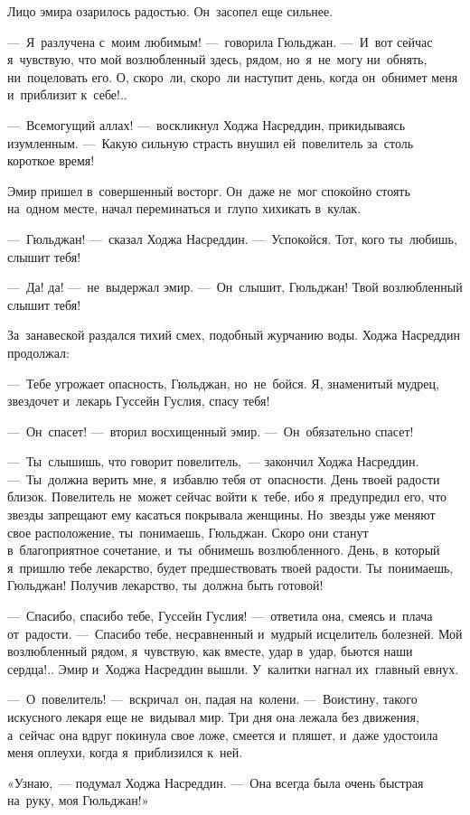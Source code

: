 \documentclass[12pt,a4paper]{book}
\begin{document}
Лицо эмира озарилось радостью. Он~засопел еще сильнее.

—~Я~разлучена с~моим любимым! —~говорила Гюльджан. —~И~вот сейчас я~чувствую, что мой возлюбленный здесь, рядом, но~я~не~могу ни~обнять, ни~поцеловать его. О, скоро~ли, скоро~ли наступит день, когда он~обнимет меня и~приблизит к~себе!..

—~Всемогущий аллах! —~воскликнул Ходжа Насреддин, прикидываясь изумленным. —~Какую сильную страсть внушил ей~повелитель за~столь короткое время!

Эмир пришел в~совершенный восторг. Он~даже не~мог спокойно стоять на~одном месте, начал переминаться и~глупо хихикать в~кулак.

—~Гюльджан! —~сказал Ходжа Насреддин. —~Успокойся. Тот, кого ты~любишь, слышит тебя!

—~Да! да! —~не~выдержал эмир. —~Он~слышит, Гюльджан! Твой возлюбленный слышит тебя!

За~занавеской раздался тихий смех, подобный журчанию воды. Ходжа Насреддин продолжал:

—~Тебе угрожает опасность, Гюльджан, но~не~бойся. Я, знаменитый мудрец, звездочет и~лекарь Гуссейн Гуслия, спасу тебя!

—~Он~спасет! —~вторил восхищенный эмир. —~Он~обязательно спасет!

—~Ты~слышишь, что говорит повелитель,~— закончил Ходжа Насреддин. —~Ты~должна верить мне, я~избавлю тебя от~опасности. День твоей радости близок. Повелитель не~может сейчас войти к~тебе, ибо я~предупредил его, что звезды запрещают ему касаться покрывала женщины. Но~звезды уже меняют свое расположение, ты~понимаешь, Гюльджан. Скоро они станут в~благоприятное сочетание, и~ты~обнимешь возлюбленного. День, в~который я~пришлю тебе лекарство, будет предшествовать твоей радости. Ты~понимаешь, Гюльджан! Получив лекарство, ты~должна быть готовой!

—~Спасибо, спасибо тебе, Гуссейн Гуслия! —~ответила она, смеясь и~плача от~радости. —~Спасибо тебе, несравненный и~мудрый исцелитель болезней. Мой возлюбленный рядом, я~чувствую, как вместе, удар в~удар, бьются наши сердца!.. Эмир и~Ходжа Насреддин вышли. У~калитки нагнал их~главный евнух.

—~О~повелитель! —~вскричал~он, падая на~колени. —~Воистину, такого искусного лекаря еще не~видывал мир. Три дня она лежала без движения, а~сейчас она вдруг покинула свое ложе, смеется и~пляшет, и~даже удостоила меня оплеухи, когда я~приблизился к~ней.

«Узнаю,~— подумал Ходжа Насреддин. —~Она всегда была очень быстрая на~руку, моя Гюльджан!»
\end{document}
